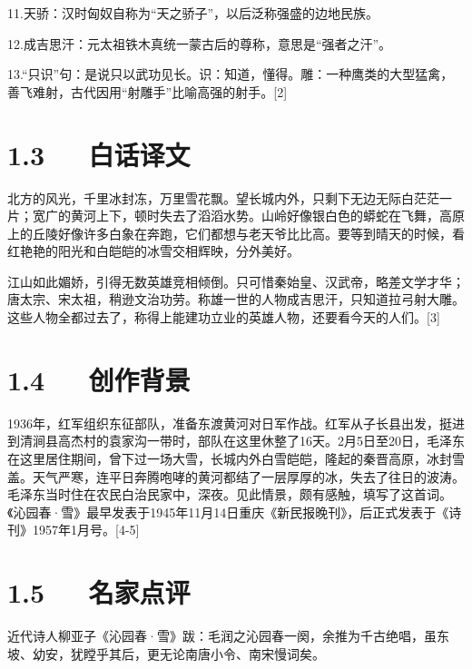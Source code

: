 \documentclass[letterpaper,12pt,english]{sphinxmanual}
\begin{document}
11.天骄：汉时匈奴自称为“天之骄子”，以后泛称强盛的边地民族。

12.成吉思汗：元太祖铁木真统一蒙古后的尊称，意思是“强者之汗”。

13.“只识”句：是说只以武功见长。识：知道，懂得。雕：一种鹰类的大型猛禽，善飞难射，古代因用“射雕手”比喻高强的射手。{[}2{]}


\section{1.3   白话译文}
\label{\detokenize{p01_u6563_u6587/_u6bdb_u6cfd_u4e1c-_u6c81_u56ed_u6625_xb7_u96ea:id5}}
北方的风光，千里冰封冻，万里雪花飘。望长城内外，只剩下无边无际白茫茫一片；宽广的黄河上下，顿时失去了滔滔水势。山岭好像银白色的蟒蛇在飞舞，高原上的丘陵好像许多白象在奔跑，它们都想与老天爷比比高。要等到晴天的时候，看红艳艳的阳光和白皑皑的冰雪交相辉映，分外美好。

江山如此媚娇，引得无数英雄竞相倾倒。只可惜秦始皇、汉武帝，略差文学才华；唐太宗、宋太祖，稍逊文治功劳。称雄一世的人物成吉思汗，只知道拉弓射大雕。这些人物全都过去了，称得上能建功立业的英雄人物，还要看今天的人们。{[}3{]}


\section{1.4   创作背景}
\label{\detokenize{p01_u6563_u6587/_u6bdb_u6cfd_u4e1c-_u6c81_u56ed_u6625_xb7_u96ea:id6}}
1936年，红军组织东征部队，准备东渡黄河对日军作战。红军从子长县出发，挺进到清涧县高杰村的袁家沟一带时，部队在这里休整了16天。2月5日至20日，毛泽东在这里居住期间，曾下过一场大雪，长城内外白雪皑皑，隆起的秦晋高原，冰封雪盖。天气严寒，连平日奔腾咆哮的黄河都结了一层厚厚的冰，失去了往日的波涛。毛泽东当时住在农民白治民家中，深夜。见此情景，颇有感触，填写了这首词。《沁园春·雪》最早发表于1945年11月14日重庆《新民报晚刊》，后正式发表于《诗刊》1957年1月号。{[}4-5{]}


\section{1.5   名家点评}
\label{\detokenize{p01_u6563_u6587/_u6bdb_u6cfd_u4e1c-_u6c81_u56ed_u6625_xb7_u96ea:id7}}
近代诗人柳亚子《沁园春·雪》跋：毛润之沁园春一阕，余推为千古绝唱，虽东坡、幼安，犹瞠乎其后，更无论南唐小令、南宋慢词矣。
\end{document}
